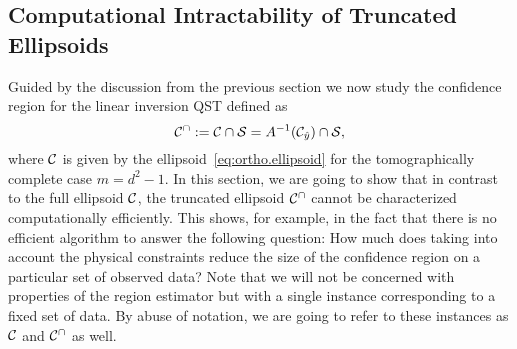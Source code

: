 \subsection{Computational Intractability of Truncated Ellipsoids}
\label{sub:ortho.hard}

Guided by the discussion from the previous section we now study the confidence region for the linear inversion QST defined as
\begin{equation}
  \label{eq:ortho.truncated_ellipsoid}
  \mathcal{C}^\cap := \mathcal{C} \cap \mathcal{S} = A^{-1}(\mathcal{C}_{\hat{y}}) \cap \mathcal{S},
\end{equation}
where $\mathcal{C}$ is given by the ellipsoid~\eqref{eq:ortho.ellipsoid} for the tomographically complete case $m=d^2 - 1$.
In this section, we are going to show that in contrast to the full ellipsoid $\mathcal{C}$, the truncated ellipsoid $\mathcal{C}^\cap$ cannot be characterized computationally efficiently.
This shows, for example, in the fact that there is no efficient algorithm to answer the following question:
How much does taking into account the physical constraints reduce the size of the confidence region on a particular set of observed data?
Note that we will not be concerned with properties of the region estimator but with a single instance corresponding to a fixed set of data.
By abuse of notation, we are going to refer to these instances as $\mathcal{C}$ and $\mathcal{C}^\cap$ as well.


